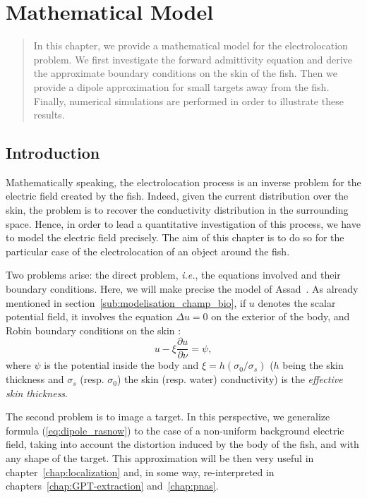 \def\chapname{Mathematical Model}
\chapter[\chapname]{
\chapname {}}

\label{chap:math-model}

\begin{abstract}
In this chapter, we provide a mathematical model for the
electrolocation problem. We first investigate
the forward admittivity equation and derive the
approximate boundary conditions on the skin of the fish. Then we
provide a dipole approximation for small targets away from the
fish. Finally, numerical simulations are performed in order to 
illustrate these results.
\end{abstract}


\section{Introduction}

Mathematically speaking, the electrolocation process
is an inverse problem for the
electric field created by the fish. Indeed, given the current
distribution over the skin,  the problem is to recover the
conductivity distribution in the surrounding space. Hence, 
in order to lead a quantitative investigation of this process,
we have to model the electric field precisely. The aim of this chapter is to 
do so for the particular case of the electrolocation of an object around the fish.


Two problems arise: the direct problem, \emph{i.e.}, the equations
involved and their boundary conditions. 
Here, we will make precise the model of 
Assad~\cite{assad1997phd,assad1990hypercube}. As already mentioned in
section~\ref{sub:modelisation_champ_bio}, if
$u$ denotes the scalar potential field, it involves
the equation $\Delta u=0$ on the exterior of the body,
and Robin boundary conditions on the skin :
\begin{equation}
u-\xi\frac{\partial u}{\partial\nu}=\psi,\label{eq:assad_BC}
\end{equation}
 where $\psi$ is the potential inside the body and $\xi=h(\sigma_{0}/\sigma_{s})$
($h$ being the skin thickness and $\sigma_{s}$ (resp.
$\sigma_{0}$) the skin (resp. water) conductivity) is the
\emph{effective skin thickness}. 

The second problem is to image a target. In this perspective,
we generalize formula (\ref{eq:dipole_rasnow}) to the case of a
non-uniform background electric field, taking into account the
distortion induced by the body of the fish, and with any shape of
the target. This approximation will be then very useful in chapter~\ref{chap:localization} and,
in some way, re-interpreted in chapters~\ref{chap:GPT-extraction} and~\ref{chap:pnas}. 

